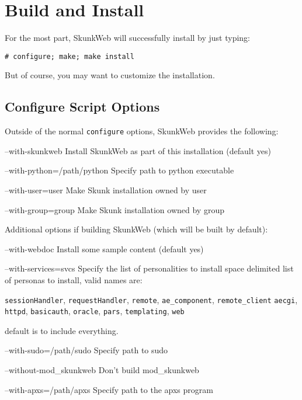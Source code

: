 \documentclass[titlepage]{manual}
\begin{document}
\chapter{Build and Install}
For the most part, SkunkWeb will successfully install by just typing:
\begin{verbatim}
# configure; make; make install
\end{verbatim}
But of course, you may want to customize the installation.

\section{Configure Script Options}
Outside of the normal \texttt{configure} options, SkunkWeb provides
the following:

\begin{argdesc}
\item[--with-skunkweb]       Install SkunkWeb as part of this installation (default yes)
\item[--with-python=/path/python]   Specify path to python executable
\item[--with-user=user]        Make Skunk installation owned by user
\item[--with-group=group]      Make Skunk installation owned by group
\end{argdesc}

Additional options if building SkunkWeb (which will be built by default):
\begin{argdesc}
\item[--with-webdoc] Install some sample content (default yes)
\item[--with-services=svcs] Specify the list of personalities to
install space delimited list of personas to install, valid names are:

\texttt{sessionHandler}, \texttt{requestHandler}, \texttt{remote},
\texttt{ae_component}, \texttt{remote_client}
\texttt{aecgi}, \texttt{httpd}, \texttt{basicauth}, \texttt{oracle},
\texttt{pars}, \texttt{templating}, \texttt{web}

default is to include everything.

\item[--with-sudo=/path/sudo]  Specify path to sudo
\item[--without-mod_skunkweb]  Don't build mod_skunkweb
\item[--with-apxs=/path/apxs]  Specify path to the apxs program
\end{argdesc}
\end{document}
